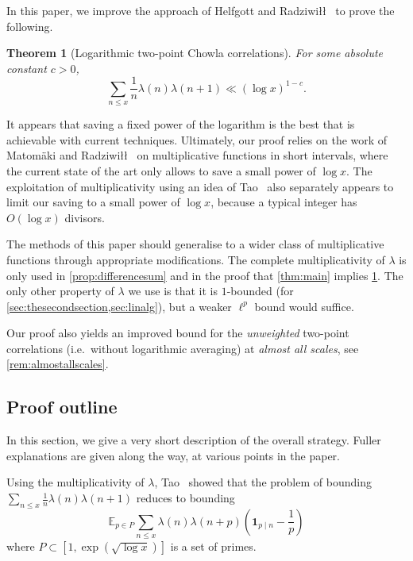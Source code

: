 \documentclass[11pt]{amsart}
\newtheorem{theorem}{Theorem}[section]
\theoremstyle{definition}
\renewcommand{\leq}{\leqslant}
\newcommand{\ind}[1]{\mathbf{1}_{#1}}
\newcommand{\E}{\mathbb{E}}
\begin{document}
In this paper, we improve the approach of Helfgott and Radziwi\l\l~\cite{HR} to prove the following.
\begin{theorem}[Logarithmic two-point Chowla correlations]
\label{cor:manipulation}
For some absolute constant $c>0$,
\begin{equation*}
\sum_{n\leq x} \frac 1n \lambda(n) \lambda(n+1) \ll (\log x)^{1-c}.
\end{equation*}
\end{theorem}
It appears that saving a fixed power of the logarithm is the best that is achievable with current techniques. Ultimately, our proof relies on the work of Matomäki and Radziwi\l\l~\cite{MR} on multiplicative functions in short intervals, where the current state of the art only allows to save a small power of $\log x$. The exploitation of multiplicativity using an idea of Tao~\cite{T} also separately appears to limit our saving to a small power of $\log x$, because a typical integer has $O(\log x)$ divisors. 

The methods of this paper should generalise to a wider class of multiplicative functions through appropriate modifications. The complete multiplicativity of $\lambda$ is only used in \cref{prop:differencesum} and in the proof that \cref{thm:main} implies \cref{cor:manipulation}. The only other property of $\lambda$ we use is that it is $1$-bounded (for \cref{sec:thesecondsection,sec:linalg}), but a weaker $\ell^p$ bound would suffice.

Our proof also yields an improved bound for the \emph{unweighted} two-point correlations (i.e.~without logarithmic averaging) at \emph{almost all scales}, see \cref{rem:almostallscales}. 


\subsection{Proof outline}
In this section, we give a very short description of the overall strategy. Fuller explanations are given along the way, at various points in the paper. 

Using the multiplicativity of $\lambda$, Tao~\cite{T} showed that the problem of bounding $\sum_{n\leq x} \frac 1n \lambda(n) \lambda(n+1)$ reduces to bounding 
\begin{equation*}
	\E_{p\in P} \sum_{n\leq x} \lambda(n) \lambda(n+p) \left(\ind{p\mid n}-\frac{1}{p}\right)
\end{equation*}
where $P \subset [1, \exp(\sqrt{\log x})]$ is a set of primes.
\end{document}
